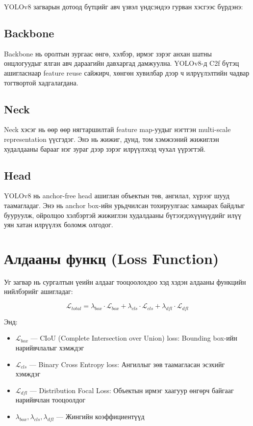YOLOv8 загварын дотоод бүтцийг авч үзвэл үндсэндээ гурван хэсгээс бүрдэнэ:

\subsection{Backbone}
Backbone нь оролтын зургаас өнгө, хэлбэр, ирмэг зэрэг анхан шатны онцлогуудыг ялган авч дараагийн давхаргад дамжуулна. YOLOv8-д C2f бүтэц ашигласнаар feature reuse сайжирч, хөнгөн хувилбар дээр ч илрүүлэлтийн чадвар тогтвортой хадгалагдана.

\subsection{Neck}
Neck хэсэг нь өөр өөр нягтаршилтай feature map-уудыг нэгтгэн multi-scale representation үүсгэдэг. Энэ нь жижиг, дунд, том хэмжээний жижиглэн худалдааны барааг нэг зураг дээр зэрэг илрүүлэхэд чухал үүрэгтэй.

\subsection{Head}
YOLOv8 нь anchor-free head ашиглан объектын төв, ангилал, хүрээг шууд таамагладаг. Энэ нь anchor box-ийн урьдчилсан тохируулгаас хамаарах байдлыг бууруулж, ойролцоо хэлбэртэй жижиглэн худалдааны бүтээгдэхүүнүүдийг илүү уян хатан илрүүлэх боломж олгодог.

\section{Алдааны функц (Loss Function)}

Уг загвар нь сургалтын үеийн алдааг тооцоолохдоо хэд хэдэн алдааны функцийн нийлбэрийг ашигладаг:

\begin{equation}
    \mathcal{L}_{total} = \lambda_{box} \cdot \mathcal{L}_{box} + \lambda_{cls} \cdot \mathcal{L}_{cls} + \lambda_{dfl} \cdot \mathcal{L}_{dfl}
\end{equation}

Энд:
\begin{itemize}
    \item $\mathcal{L}_{box}$ --- CIoU (Complete Intersection over Union) loss: Bounding box-ийн нарийвчлалыг хэмждэг
    \item $\mathcal{L}_{cls}$ --- Binary Cross Entropy loss: Ангиллыг зөв таамагласан эсэхийг хэмждэг
    \item $\mathcal{L}_{dfl}$ --- Distribution Focal Loss: Объектын ирмэг хаагуур өнгөрч байгааг нарийвчлан тооцоолдог
    \item $\lambda_{box}, \lambda_{cls}, \lambda_{dfl}$ --- Жингийн коэффициентүүд
\end{itemize}

